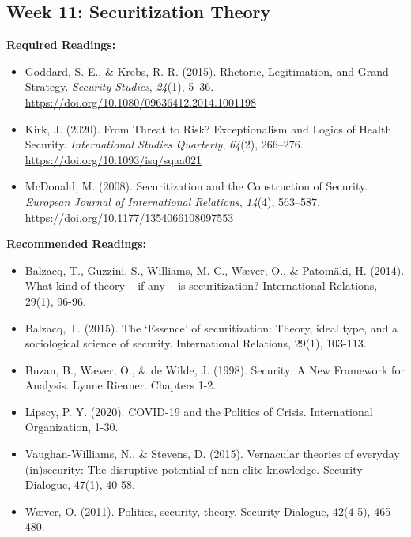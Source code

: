 \documentclass[
  letterpaper,
  DIV=11,
  numbers=noendperiod]{scrartcl}
\providecommand{\tightlist}{%
  \setlength{\itemsep}{0pt}\setlength{\parskip}{0pt}}\usepackage{longtable,booktabs,array}
\begin{document}
\hypertarget{week-11-securitization-theory}{%
\subsection*{Week 11: Securitization
Theory}\label{week-11-securitization-theory}}

\textbf{Required Readings:}

\begin{itemize}
\tightlist
\item
  Goddard, S. E., \& Krebs, R. R. (2015). Rhetoric, {Legitimation}, and
  {Grand} {Strategy}. \emph{Security Studies}, \emph{24}(1), 5--36.
  \url{https://doi.org/10.1080/09636412.2014.1001198}
\item
  Kirk, J. (2020). From {Threat} to {Risk}? {Exceptionalism} and
  {Logics} of {Health} {Security}. \emph{International Studies
  Quarterly}, \emph{64}(2), 266--276.
  \url{https://doi.org/10.1093/isq/sqaa021}
\item
  McDonald, M. (2008). Securitization and the {Construction} of
  {Security}. \emph{European Journal of International Relations},
  \emph{14}(4), 563--587. \url{https://doi.org/10.1177/1354066108097553}
\end{itemize}

\textbf{Recommended Readings:}

\begin{itemize}
\tightlist
\item
  Balzacq, T., Guzzini, S., Williams, M. C., Wæver, O., \& Patomäki, H.
  (2014). What kind of theory -- if any -- is securitization?
  International Relations, 29(1), 96-96.
\item
  Balzacq, T. (2015). The `Essence' of securitization: Theory, ideal
  type, and a sociological science of security. International Relations,
  29(1), 103-113.
\item
  Buzan, B., Wæver, O., \& de Wilde, J. (1998). Security: A New
  Framework for Analysis. Lynne Rienner. Chapters 1-2.
\item
  Lipscy, P. Y. (2020). COVID-19 and the Politics of Crisis.
  International Organization, 1-30.
\item
  Vaughan-Williams, N., \& Stevens, D. (2015). Vernacular theories of
  everyday (in)security: The disruptive potential of non-elite
  knowledge. Security Dialogue, 47(1), 40-58.
\item
  Wæver, O. (2011). Politics, security, theory. Security Dialogue,
  42(4-5), 465-480.
\end{itemize}
\end{document}
